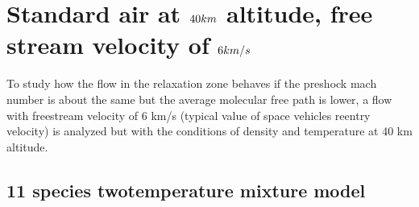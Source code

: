 \documentclass[letterpaper,10pt,english]{jupyterBook}
\begin{document}
\section{Standard air at \protect\(40 km\protect\) altitude, free stream velocity of \protect\(6 km/s\protect\)}
\label{\detokenize{Results/Results:standard-air-at-40-km-altitude-free-stream-velocity-of-6-km-s}}
\sphinxAtStartPar
To study how the flow in the relaxation zone behaves if the pre\sphinxhyphen{}shock mach number is about the same but the average molecular free path is lower, a flow with free\sphinxhyphen{}stream velocity of 6 km/s (typical value of space vehicles re\sphinxhyphen{}entry velocity) is analyzed but with the conditions of density and temperature at 40 km altitude.


\subsection{11 species two\sphinxhyphen{}temperature mixture model}
\label{\detokenize{Results/Results:id3}}
\end{document}
